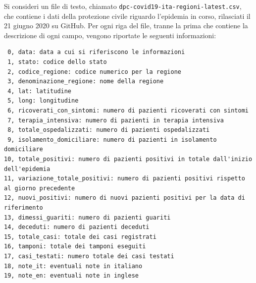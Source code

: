 Si consideri un file di testo, chiamato {\tt dpc-covid19-ita-regioni-latest.csv}, che contiene i
dati della protezione civile riguardo l'epidemia in corso, rilasciati il 21 giugno 2020 su GitHub.
Per ogni riga del file, tranne la prima che contiene la descrizione di ogni campo, vengono riportate le seguenti informazioni:
\begin{verbatim}
 0, data: data a cui si riferiscono le informazioni
 1, stato: codice dello stato
 2, codice_regione: codice numerico per la regione
 3, denominazione_regione: nome della regione
 4, lat: latitudine
 5, long: longitudine
 6, ricoverati_con_sintomi: numero di pazienti ricoverati con sintomi
 7, terapia_intensiva: numero di pazienti in terapia intensiva
 8, totale_ospedalizzati: numero di pazienti ospedalizzati
 9, isolamento_domiciliare:	numero di pazienti in isolamento domiciliare
10, totale_positivi: numero di pazienti positivi in totale dall'inizio dell'epidemia
11, variazione_totale_positivi:	numero di pazienti positivi rispetto al giorno precedente
12, nuovi_positivi: numero di nuovi pazienti positivi per la data di riferimento
13, dimessi_guariti: numero di pazienti guariti
14, deceduti: numero di pazienti deceduti
15, totale_casi: totale dei casi registrati
16, tamponi: totale dei tamponi eseguiti
17, casi_testati: numero totale dei casi testati
18, note_it: eventuali note in italiano
19, note_en: eventuali note in inglese
\end{verbatim}


